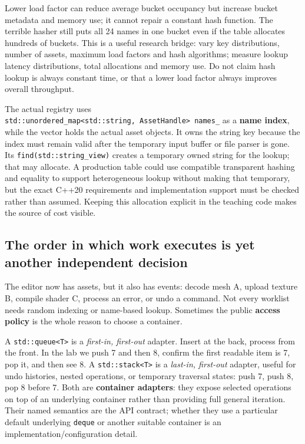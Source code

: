 Lower load factor can reduce average bucket occupancy but increase bucket metadata and memory use; it cannot repair a constant hash function. The terrible hasher still puts all 24 names in one bucket even if the table allocates hundreds of buckets. This is a useful research bridge: vary key distributions, number of assets, maximum load factors and hash algorithms; measure lookup latency distributions, total allocations and memory use. Do not claim hash lookup is always constant time, or that a lower load factor always improves overall throughput.

The actual registry uses \texttt{std::unordered\_map\textless{}std::string,\ AssetHandle\textgreater{}\ names\_} as a \textbf{name index}, while the vector holds the actual asset objects. It owns the string key because the index must remain valid after the temporary input buffer or file parser is gone. Its \texttt{find(std::string\_view)} creates a temporary owned string for the lookup; that may allocate. A production table could use compatible transparent hashing and equality to support heterogeneous lookup without making that temporary, but the exact C++20 requirements and implementation support must be checked rather than assumed. Keeping this allocation explicit in the teaching code makes the source of cost visible.

\subsection{The order in which work executes is yet another independent decision}\label{05-engine-i-ch005-the-order-in-which-work-executes-is-yet-another-independent-decision}

The editor now has assets, but it also has events: decode mesh A, upload texture B, compile shader C, process an error, or undo a command. Not every worklist needs random indexing or name-based lookup. Sometimes the public \textbf{access policy} is the whole reason to choose a container.

A \texttt{std::queue\textless{}T\textgreater{}} is a \emph{first-in, first-out} adapter. Insert at the back, process from the front. In the lab we push 7 and then 8, confirm the first readable item is 7, pop it, and then see 8. A \texttt{std::stack\textless{}T\textgreater{}} is a \emph{last-in, first-out} adapter, useful for undo histories, nested operations, or temporary traversal states: push 7, push 8, pop 8 before 7. Both are \textbf{container adapters}: they expose selected operations on top of an underlying container rather than providing full general iteration. Their named semantics are the API contract; whether they use a particular default underlying \texttt{deque} or another suitable container is an implementation/configuration detail.

